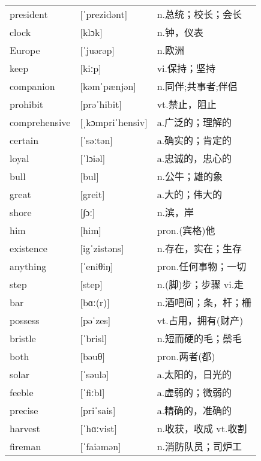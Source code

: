 \documentclass[a4paper]{article}
\begin{document}
\section{}
\begin{tabular}{l l l}

president & [ˈprezidənt] & n.总统；校长；会长 \\
clock & [klɔk] & n.钟，仪表 \\
Europe & [ˈjuərəp] & n.欧洲 \\
keep & [kiːp] & vi.保持；坚持 \\
companion & [kəmˈpænjən] & n.同伴;共事者;伴侣 \\
prohibit & [prəˈhibit] & vt.禁止，阻止 \\
comprehensive & [ˌkɔmpriˈhensiv] & a.广泛的；理解的 \\
certain & [ˈsəːtən] & a.确实的；肯定的 \\
loyal & [ˈlɔiəl] & a.忠诚的，忠心的 \\
bull & [bul] & n.公牛；雄的象 \\
great & [greit] & a.大的；伟大的 \\
shore & [∫ɔː] & n.滨，岸 \\
him & [him] & pron.(宾格)他 \\
existence & [igˈzistəns] & n.存在，实在；生存 \\
anything & [ˈeniθiŋ] & pron.任何事物；一切 \\
step & [step] & n.(脚)步；步骤 vi.走 \\
bar & [bɑː(r)] & n.酒吧间；条，杆；栅 \\
possess & [pəˈzes] & vt.占用，拥有(财产) \\
bristle & [ˈbrisl] & n.短而硬的毛；鬃毛 \\
both & [bəuθ] & pron.两者(都) \\
solar & [ˈsəulə] & a.太阳的，日光的 \\
feeble & [ˈfiːbl] & a.虚弱的；微弱的 \\
precise & [priˈsais] & a.精确的，准确的 \\
harvest & [ˈhɑːvist] & n.收获，收成 vt.收割 \\
fireman & [ˈfaiəmən] & n.消防队员；司炉工 \\

\end{tabular}
\end{document}
